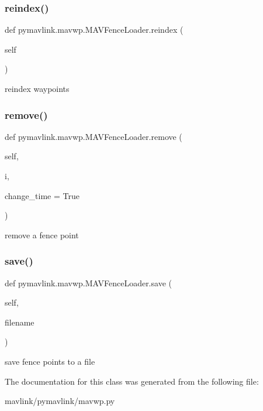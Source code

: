 \subsubsection{\texorpdfstring{reindex()}{reindex()}}
{\footnotesize\ttfamily def pymavlink.\+mavwp.\+M\+A\+V\+Fence\+Loader.\+reindex (\begin{DoxyParamCaption}\item[{}]{self }\end{DoxyParamCaption})}

\begin{DoxyVerb}reindex waypoints\end{DoxyVerb}
 \mbox{\label{classpymavlink_1_1mavwp_1_1MAVFenceLoader_a7c1a07eaf7b428d33bc963335ae4d5bd}} 
\subsubsection{\texorpdfstring{remove()}{remove()}}
{\footnotesize\ttfamily def pymavlink.\+mavwp.\+M\+A\+V\+Fence\+Loader.\+remove (\begin{DoxyParamCaption}\item[{}]{self,  }\item[{}]{i,  }\item[{}]{change\+\_\+time = {\ttfamily True} }\end{DoxyParamCaption})}

\begin{DoxyVerb}remove a fence point\end{DoxyVerb}
 \mbox{\label{classpymavlink_1_1mavwp_1_1MAVFenceLoader_a34fdb2bc4e79b7649714adb5d0bfd667}} 
\subsubsection{\texorpdfstring{save()}{save()}}
{\footnotesize\ttfamily def pymavlink.\+mavwp.\+M\+A\+V\+Fence\+Loader.\+save (\begin{DoxyParamCaption}\item[{}]{self,  }\item[{}]{filename }\end{DoxyParamCaption})}

\begin{DoxyVerb}save fence points to a file\end{DoxyVerb}
 

The documentation for this class was generated from the following file\+:\begin{DoxyCompactItemize}
\item 
mavlink/pymavlink/mavwp.\+py\end{DoxyCompactItemize}
